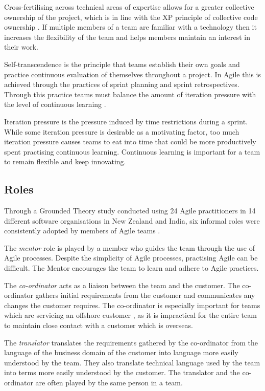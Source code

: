 \documentclass[conference]{IEEEtran}
\begin{document}
Cross-fertilising across technical areas of expertise allows for a greater
collective ownership of the project, which is in line with the XP principle of
collective code ownership \cite{beck1999embracing}. If multiple members of a
team are familiar with a technology then it increases the flexibility of the
team and helps members maintain an interest in their work.

Self-transcendence is the principle that teams establish their own goals and
practice continuous evaluation of themselves throughout a project. In Agile this
is achieved through the practices of sprint planning and sprint retrospectives.
Through this practice teams must balance the amount of iteration pressure with
the level of continuous learning \cite{hoda2010balancing}.

Iteration pressure is the pressure induced by time restrictions during a sprint.
While some iteration pressure is desirable as a motivating factor, too much
iteration pressure causes teams to eat into time that could be more productively
spent practising continuous learning. Continuous learning is important for a
team to remain flexible and keep innovating.

\subsection{Roles}

Through a Grounded Theory \cite{strauss1994grounded} study conducted using 24
Agile practitioners in 14 different software organisations in New Zealand and
India, six informal roles were consistently adopted by members of Agile teams
\cite{hoda2010organizing}.

The \emph{mentor} role is played by a member who guides the team through the use
of Agile processes. Despite the simplicity of Agile processes, practising Agile
can be difficult. The Mentor encourages the team to learn and adhere to Agile
practices.

The \emph{co-ordinator} acts as a liaison between the team and the customer. The
co-ordinator gathers initial requirements from the customer and communicates any
changes the customer requires. The co-ordinator is especially important for
teams which are servicing an offshore customer \cite{hoda2010organizing}, as it
is impractical for the entire team to maintain close contact with a customer
which is overseas.

The \emph{translator} translates the requirements gathered by the co-ordinator
from the language of the business domain of the customer into language more
easily understood by the team. They also translate technical language used by
the team into terms more easily understood by the customer. The translator and
the  co-ordinator are often played by the same person in a team.
\end{document}
